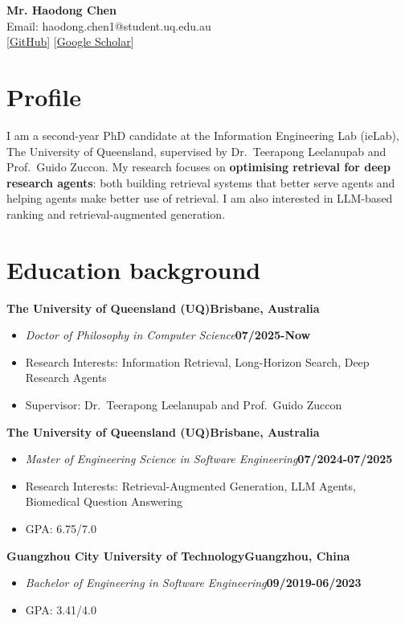 \documentclass[10pt]{article}
\newcommand{\org}[2]{\textbf{#1}\hfill\textbf{#2}\par}
\newcommand{\role}[2]{\textit{#1}\hfill\textbf{#2}}
\newcommand{\plink}[2]{[\href{#2}{\color{blue}\underline{#1}}]}
\newcommand{\entrygap}{\par\vspace{14.04pt}}
\begin{document}
\begin{center}
  {\fontsize{15}{18}\selectfont\bfseries Mr. Haodong Chen}\\[2pt]
  Email: haodong.chen1@student.uq.edu.au\\
  \plink{Homepage}{https://donovan0243.github.io}
  \plink{GitHub}{https://github.com/Donovan0243}
  \plink{Google Scholar}{https://scholar.google.com/citations?user=Iotk_v8AAAAJ}
\end{center}
\vspace{-14pt}

\section{Profile}
I am a second-year PhD candidate at the Information Engineering Lab (ieLab), The University of Queensland, supervised by
Dr.~Teerapong Leelanupab and Prof.~Guido Zuccon. My research focuses on \textbf{optimising retrieval for deep research agents}:
both building retrieval systems that better serve agents and helping agents make better use of retrieval. I am also interested in
LLM-based ranking and retrieval-augmented generation.

\section{Education background}
\org{The University of Queensland (UQ)}{Brisbane, Australia}
\begin{itemize}
  \item \role{Doctor of Philosophy in Computer Science}{07/2025-Now}
  \item Research Interests: Information Retrieval, Long-Horizon Search, Deep Research Agents
  \item Supervisor: Dr.~Teerapong Leelanupab and Prof.~Guido Zuccon
\end{itemize}
\entrygap
\org{The University of Queensland (UQ)}{Brisbane, Australia}
\begin{itemize}
  \item \role{Master of Engineering Science in Software Engineering}{07/2024-07/2025}
  \item Research Interests: Retrieval-Augmented Generation, LLM Agents, Biomedical Question Answering
  \item GPA: 6.75/7.0
\end{itemize}
\entrygap
\org{Guangzhou City University of Technology}{Guangzhou, China}
\begin{itemize}
  \item \role{Bachelor of Engineering in Software Engineering}{09/2019-06/2023}
  \item GPA: 3.41/4.0
\end{itemize}
\end{document}
